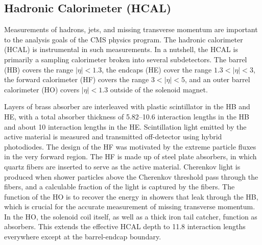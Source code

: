 \subsection{Hadronic Calorimeter (HCAL)}
Measurements of hadrons, jets, and missing transverse momentum are important to the analysis goals of the CMS physics program. The hadronic calorimeter (HCAL) is instrumental in such 
measurements. In a nutshell, the HCAL is primarily a sampling calorimeter broken into several subdetectors. The barrel (HB) covers the range $|\eta| < 1.3$, the endcaps (HE) cover the range $1.3 < |\eta| < 3$, the forward calorimeter (HF) covers the range $3 < |\eta| < 5$, and an outer barrel calorimeter (HO) covers $|\eta| < 1.3$ outside of the solenoid magnet. 

Layers of brass absorber are interleaved with plastic scintillator in the HB and HE, with a total absorber thickness of 5.82--10.6 interaction lengths in the HB and about 10 interaction lengths in the HE. Scintillation light emitted by the active material is measured and transmitted off-detector using hybrid photodiodes.
The design of the HF was motivated by the extreme particle fluxes in the very forward region. The HF is made up of steel plate absorbers, in which quartz fibers are inserted to serve as the active material. Cherenkov light is produced when shower particles above the Cherenkov threshold 
pass through the fibers, and a calculable fraction of the light is captured by the fibers. The function of the HO is to recover the energy in showers that leak through the HB, which is crucial for the accurate measurement of missing transverse momentum. In the HO, the solenoid coil itself, as well as a thick iron tail catcher, function 
as absorbers. This extends the effective HCAL depth to 11.8 interaction lengths everywhere except at the barrel-endcap boundary. 

